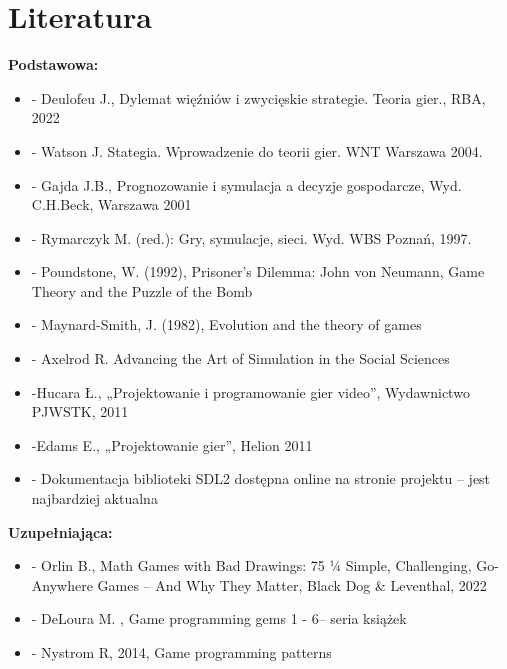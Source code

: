 \documentclass[12pt, a4paper]{article}
\begin{document}
\section{Literatura}

\textbf{Podstawowa:}
\begin{itemize}
  \item - Deulofeu J., Dylemat więźniów i zwycięskie strategie. Teoria gier., RBA, 2022
  \item - Watson J. Stategia. Wprowadzenie do teorii gier. WNT Warszawa 2004.
  \item - Gajda J.B., Prognozowanie i symulacja a decyzje gospodarcze, Wyd. C.H.Beck, Warszawa 2001
  \item - Rymarczyk M. (red.): Gry, symulacje, sieci. Wyd. WBS Poznań, 1997.
  \item - Poundstone, W. (1992), Prisoner's Dilemma: John von Neumann, Game Theory and the Puzzle of the Bomb
  \item - Maynard-Smith, J. (1982), Evolution and the theory of games
  \item - Axelrod R. Advancing the Art of Simulation in the Social Sciences
  \item -Hucara Ł., „Projektowanie i programowanie gier video”, Wydawnictwo PJWSTK, 2011
  \item -Edams E., „Projektowanie gier”, Helion 2011
  \item - Dokumentacja biblioteki SDL2 dostępna online na stronie projektu – jest najbardziej aktualna
\end{itemize}

\textbf{Uzupełniająca:}
\begin{itemize}
  \item - Orlin B., Math Games with Bad Drawings: 75 ¼ Simple, Challenging, Go-Anywhere Games – And Why They Matter,  Black Dog \& Leventhal, 2022
  \item - DeLoura M. ,  Game programming gems 1 - 6– seria książek
  \item - Nystrom R, 2014, Game programming patterns
\end{itemize}
\end{document}
